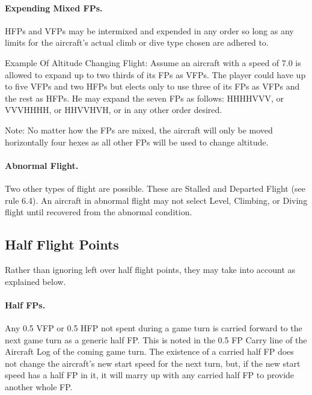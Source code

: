 \paragraph{Expending Mixed FPs.} HFPs and VFPs may be intermixed and expended in any order so long as any limits for the aircraft's actual climb or dive type chosen are adhered to.

Example Of Altitude Changing Flight: Assume an aircraft with a speed of 7.0 is allowed to expand up to two thirds of its FPs as VFPs. The player could have up to five VFPs and two HFPs but elects only to use three of its FPs as VFPs and the rest as HFPs. He may expand the seven FPs as follows:
HHHHVVV, or VVVHHHH, or HHVVHVH, or in any other order desired.

Note: No matter how the FPs are mixed, the aircraft will only be moved horizontally four hexes as all other FPs will be used to change altitude.

\paragraph{Abnormal Flight.} Two other types of flight are possible. These are Stalled and Departed Flight (see rule 6.4).  An aircraft in abnormal flight may not select Level, Climbing, or Diving flight until recovered from the abnormal condition.

\advancedrules

\subsection{Half Flight Points}


Rather than ignoring left over half flight points, they may take into account as explained below.

\paragraph{Half FPs.} Any 0.5 VFP or 0.5 HFP not spent during a game turn is carried forward to the next game turn as a generic half FP. This is noted in the 0.5 FP Carry line of the Aircraft Log of the coming game turn. The existence of a carried half FP does not change the aircraft's new start speed for the next turn, but, if the new start speed has a half FP in it, it will marry up with any carried half FP to provide another whole FP.

